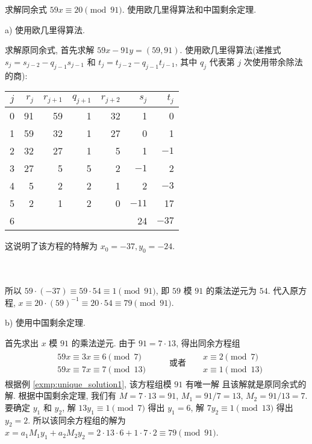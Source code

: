 \documentclass[a5paper,fleqn,10pt]{article}
\begin{document}
\begin{exmp}
	求解同余式 $59x\equiv 20\pmod{91}$. 使用欧几里得算法和中国剩余定理.
\end{exmp}
\begin{solution}
	a) 使用欧几里得算法.

	求解原同余式, 首先求解 $59x-91y=(59,91)$. 使用欧几里得算法(递推式 $s_j=s_{j-2}-q_{j-1}s_{j-1}$
	和 $t_j=t_{j-2}-q_{j-1}t_{j-1}$, 其中 $q_j$ 代表第 $j$ 次使用带余除法的商):

	\begin{minipage}{0.6\linewidth}%
		\begin{tabular}{c|rrrrrr}
			$j$ & $r_j$ & $r_{j+1}$ & $q_{j+1}$ & $r_{j+2}$ & $s_j$ & $t_j$ \\
			\hline
			0   & 91    & 59        & 1         & 32        & 1     & 0     \\
			1   & 59    & 32        & 1         & 27        & 0     & 1     \\
			2   & 32    & 27        & 1         & 5         & 1     & $-1$  \\
			3   & 27    & 5         & 5         & 2         & $-1$  & 2     \\
			4   & 5     & 2         & 2         & 1         & 2     & $-3$  \\
			5   & 2     & 1         & 2         & 0         & $-11$ & 17    \\
			6   &       &           &           &           & 24    & $-37$
		\end{tabular}%
	\end{minipage}
	\parbox{0.3\linewidth}{这说明了该方程的特解为 $x_0=-37,y_0=-24$.}
	\\\\
	所以 $59\cdot(-37)\equiv 59\cdot 54\equiv 1\pmod{91}$, 即 $59$ 模 $91$ 的乘法逆元为 $54$.
	代入原方程, $x\equiv 20\cdot(59)^{-1}\equiv 20\cdot 54\equiv 79\pmod{91}$.

	b) 使用中国剩余定理.

	首先求出 $x$ 模 $91$ 的乘法逆元. 由于 $91=7\cdot 13$, 得出同余方程组
	\begin{align*}
		\begin{aligned}
			 & 59x\equiv 3x\equiv 6\pmod 7   \\
			 & 59x\equiv 7x\equiv 7\pmod{13}
		\end{aligned} &  &  & \text{或者} &
		\begin{aligned}
			 & x\equiv 2\pmod 7   \\
			 & x\equiv 1\pmod{13}
		\end{aligned}
	\end{align*}
	根据例 \ref{exmp:unique_solution1}, 该方程组模 $91$ 有唯一解 且该解就是原同余式的解. 根据中国剩余定理, 我们有 $M=7\cdot 13=91$, $M_1=91/7=13$,
	$M_2=91/13=7$. 要确定 $y_1$ 和 $y_2$, 解 $13y_1\equiv 1\pmod 7$ 得出 $y_1=6$, 解 $7y_2\equiv 1\pmod{13}$ 得出 $y_2=2$.
	所以该同余方程组的解为 $x=a_1M_1y_1+a_2M_2y_2=2\cdot 13\cdot 6+1\cdot 7\cdot 2\equiv 79\pmod{91}$.
\end{solution}
\end{document}
